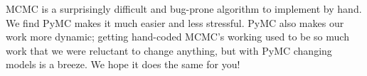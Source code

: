 
MCMC is a surprisingly difficult and bug-prone algorithm to implement by hand. We find PyMC makes it much easier and less stressful. PyMC also makes our work more dynamic; getting hand-coded MCMC's working used to be so much work that we were reluctant to change anything, but with PyMC changing models is a breeze. We hope it does the same for you!

% 

